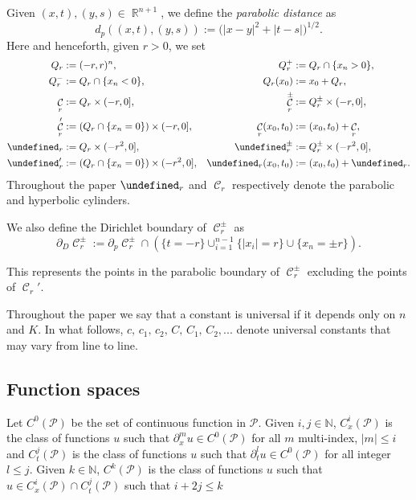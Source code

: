 \documentclass[12pt]{article}
\let\P\undefined
\numberwithin{Theorem}{section}
\theoremstyle{definition}
\theoremstyle{remark}
\numberwithin{equation}{section}
\DeclareMathOperator{\C}{\mathcal{C}}
\DeclareMathOperator{\R}{\mathbb{R}}
\newcommand{\p}{\partial}
\newcommand{\P}{\mathcal{P}}
\begin{document}
Given $(x,t), (y,s)\in \R^{n+1}$, we define the \textit{parabolic distance} as
$$
d_p((x,t), (y,s)) :=\big(|x-y|^2 + |t-s|\big)^{1/2}.
$$
Here and henceforth, given $r >0$, we set 
\begin{align*}
    Q_r &:= (-r,r)^n, & Q_r^{+} &:= Q_r \cap \{x_n > 0\}, \\
    Q_r^{-} &:= Q_r \cap \{x_n < 0\}, & Q_r(x_0) &:= x_0 + Q_r, \\
    \C_r &:= Q_r \times (-r,0], & \C_r^{\pm} &:= Q_r^{\pm} \times (-r,0], \\ 
    \C_r' &:= (Q_r \cap \{x_n=0 \}) \times (-r,0], & \C_r(x_0,t_0) &:= (x_0,t_0) + \C_r, \\
    \P_r &:= Q_r \times (-r^2,0], & \P_r^{\pm} &:= Q_r^{\pm} \times (-r^2,0], \\ 
    \P_r' &:= (Q_r \cap \{x_n=0 \}) \times (-r^2,0], & \P_r(x_0,t_0) &:= (x_0,t_0) + \P_r.
\end{align*}
Throughout the paper $\P_r$ and $\C_r$ respectively denote the parabolic and hyperbolic cylinders. 

We also define the Dirichlet boundary of $\C_r^{\pm}$ as 
\[
\p_D \C_r^{\pm}:= \p_p \C_r^{\pm} \cap \left( \{t=-r\} \cup_{i=1}^{n-1} \{ |x_i|=r \} \cup \{ x_n=\pm r \}\right).
\]

This represents the points in the parabolic boundary of $\C_r^{\pm}$ excluding the points of $\C_r'$.

Throughout the paper we say that a constant is universal if it depends only on $n$ and $K$. In what follows, $c, \, c_1, \, c_2,\, C, \, C_1,\, C_2, ...$ denote universal constants that may vary from line to line.

\subsection{Function spaces}
Let $C^{0}(\mathcal{P})$ be the set of continuous function in ${\mathcal{P}}$. Given $i,j \in \mathbb{N}$, $C_x^i(\mathcal{P})$ is the class of functions $u$ such that $\p_x^m  u \in C^0(\mathcal{P})$ for all $m$ multi-index, $|m| \leq i$ and $C_t^j(\mathcal{P})$ is the class of functions $u$ such that $\p_t^l  u \in C^0(\mathcal{P})$
for all integer $l \leq j$.  Given $k \in \mathbb{N}$, $C^k(\mathcal{P})$ is the class of functions $u$ such that $u \in C_x^i(\mathcal{P})\cap C_t^j(\mathcal{P}) $ such that $i + 2j \leq k$
\end{document}
